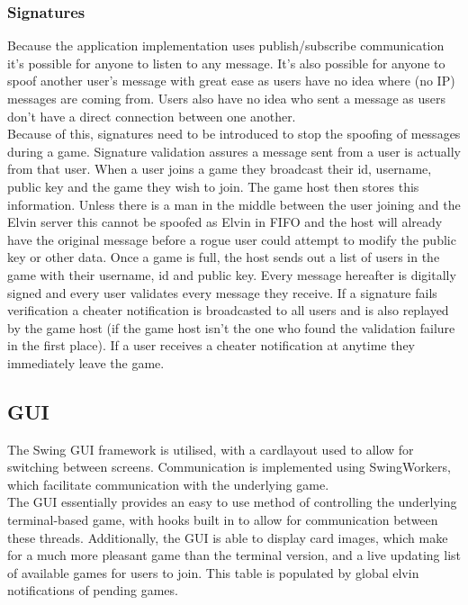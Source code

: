 \documentclass[11pt, oneside]{article}   	%
\begin{document}
\subsubsection{Signatures}

Because the application implementation uses publish/subscribe communication it’s possible for anyone to listen to any message. It’s also possible for anyone to spoof another user's message with great ease as users have no idea where (no IP) messages are coming from. Users also have no idea who sent a message as users don’t have a direct connection between one another.\\

Because of this, signatures need to be introduced to stop the spoofing of messages during a game. Signature validation assures a message sent from a user is actually from that user. When a user joins a game they broadcast their id, username, public key and the game they wish to join. The game host then stores this information. Unless there is a man in the middle between the user joining and the Elvin server this cannot be spoofed as Elvin in FIFO and the host will already have the original message before a rogue user could attempt to modify the public key or other data. Once a game is full, the host sends out a list of users in the game with their username, id and public key. Every message hereafter is digitally signed and every user validates every message they receive. If a signature fails verification a cheater notification is broadcasted to all users and is also replayed by the game host (if the game host isn't the one who found the validation failure in the first place). If a user receives a cheater notification at anytime they immediately leave the game.

\subsection{GUI}

The Swing GUI framework is utilised, with a cardlayout used to allow for switching between screens. Communication is implemented using SwingWorkers, which facilitate communication with the underlying game.\\

The GUI essentially provides an easy to use method of controlling the underlying terminal-based game, with hooks built in to allow for communication between these threads. Additionally, the GUI is able to display card images, which make for a much more pleasant game than the terminal version, and a live updating list of available games for users to join. This table is populated by global elvin notifications of pending games.
\end{document}

